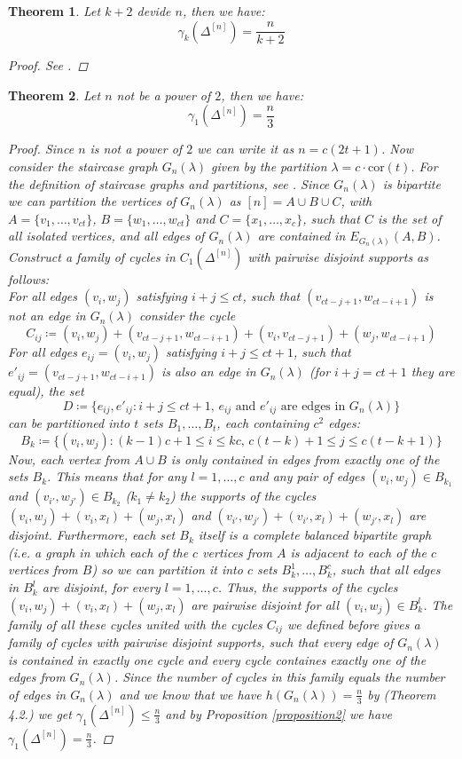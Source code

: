 \documentclass{article}
\newtheorem{thm}{Theorem}[section]
\begin{document}
\begin{thm}\label{theorem2}
Let $k+2$ devide $n$, then we have:
\[
\gamma_k(\Delta^{[n]})=\frac{n}{k+2}
\]
\begin{proof}
See \cite{1}.
\end{proof}
\end{thm}

\begin{thm}\label{theorem3}
Let $n$ not be a power of $2$, then we have:
\[
\gamma_1(\Delta^{[n]})=\frac{n}{3}
\] 
\begin{proof}
Since $n$ is not a power of $2$ we can write it as $n=c(2t+1)$. Now consider the staircase graph $G_n(\lambda)$ given by the partition $\lambda=c\cdot\text{cor}(t)$. For the definition of staircase graphs and partitions, see \cite{2}. Since $G_n(\lambda)$ is bipartite we can partition the vertices of $G_n(\lambda)$ as $[n]=A\cup B\cup C$, with $A=\{v_1,\ldots,v_{ct}\}$, $B=\{w_1,\ldots,w_{ct}\}$ and $C=\{x_1,\ldots,x_c\}$, such that $C$ is the set of all isolated vertices, and all edges of $G_n(\lambda)$ are contained in $E_{G_n(\lambda)}(A,B)$. Construct a family of cycles in $C_1(\Delta^{[n]})$ with pairwise disjoint supports as follows:\\
For all edges $(v_i,w_j)$ satisfying $i+j\leq ct$, such that $(v_{ct-j+1},w_{ct-i+1})$ is not an edge in $G_n(\lambda)$ consider the cycle
\[
C_{ij}\coloneqq (v_i,w_j)+(v_{ct-j+1},w_{ct-i+1})+(v_i,v_{ct-j+1})+(w_j,w_{ct-i+1})
\]
For all edges $e_{ij}=(v_i,w_j)$ satisfying $i+j\leq ct+1$, such that $e'_{ij}=(v_{ct-j+1},w_{ct-i+1})$ is also an edge in $G_n(\lambda)$ (for $i+j=ct+1$ they are equal), the set
\[
D\coloneqq\{e_{ij}, e'_{ij}:i+j\leq ct+1\text{, }e_{ij}\text{ and }e'_{ij}\text{ are edges in }G_n(\lambda)\}
\] can be partitioned into $t$ sets $B_1,\ldots,B_t$, each containing $c^2$ edges:
\[
B_k\coloneqq\{(v_i,w_j):(k-1)c+1\leq i\leq kc\text{, }c(t-k)+1\leq j\leq c(t-k+1)\}
\]
Now, each vertex from $A\cup B$ is only contained in edges from exactly one of the sets $B_k$. This means that for any $l=1,\ldots,c$ and any pair of edges $(v_i,w_j)\in B_{k_1}$ and $(v_{i'},w_{j'})\in B_{k_2}$ ($k_1\neq k_2$) the supports of the cycles $(v_i,w_j)+(v_i,x_l)+(w_j,x_l)$ and $(v_{i'},w_{j'})+(v_{i'},x_l)+(w_{j'},x_l)$ are disjoint. Furthermore, each set $B_k$ itself is a complete balanced bipartite graph (i.e. a graph in which each of the $c$ vertices from $A$ is adjacent to each of the $c$ vertices from $B$) so we can partition it into $c$ sets $B_k^1,\ldots,B_k^c$, such that all edges in $B_k^l$ are disjoint, for every $l=1,\ldots,c$. Thus, the supports of the cycles $(v_i,w_j)+(v_i,x_l)+(w_j,x_l)$ are pairwise disjoint for all $(v_i,w_j)\in B_k^l$. The family of all these cycles united with the cycles $C_{ij}$ we defined before gives a family of cycles with pairwise disjoint supports, such that every edge of $G_n(\lambda)$ is contained in exactly one cycle and every cycle containes exactly one of the edges from $G_n(\lambda)$. Since the number of cycles in this family equals the number of edges in $G_n(\lambda)$ and we know that we have $h(G_n(\lambda))=\frac{n}{3}$ by \cite{2} (Theorem 4.2.) we get $\gamma_1(\Delta^{[n]})\leq\frac{n}{3}$ and by Proposition \ref{proposition2} we have $\gamma_1(\Delta^{[n]})=\frac{n}{3}$.

\end{proof}
\end{thm}
\end{document}

